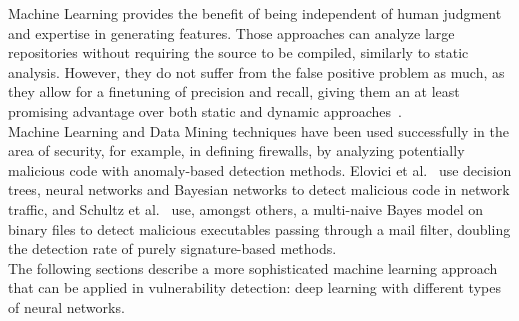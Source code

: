 \documentclass[
a4paper,
pagesize,
pdftex,
12pt,
ngerman,
fleqn,
final,
]{scrartcl}
\begin{document}
	Machine Learning provides the benefit of being independent of human judgment and expertise in generating features. Those approaches can analyze large repositories without requiring the source to be compiled, similarly to static analysis. However, they do not suffer from the false positive problem as much, as they allow for a finetuning of precision and recall, giving them an at least promising advantage over both static and dynamic approaches~\cite{Russell.2018}. \\
	Machine Learning and Data Mining techniques have been used successfully in the area of security, for example, in defining firewalls, by analyzing potentially malicious code with anomaly-based detection methods. Elovici et al.~\cite{Elovici.2007} use decision trees, neural networks and Bayesian networks to detect malicious code in network traffic, and Schultz et al.~\cite{Schultz.2000} use, amongst others, a multi-naive Bayes model on binary files to detect malicious executables passing through a mail filter, doubling the detection rate of purely signature-based methods.\\
	The following sections describe a more sophisticated machine learning approach that can be applied in vulnerability detection: deep learning with different types of neural networks. 
	
\end{document}
